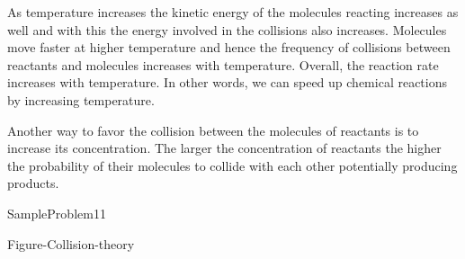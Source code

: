 \documentclass[main.tex]{subfiles}
\newcommand\chapterlabel{kinetics}
\begin{document}
\begin{description}
\begin{minipage}[b]{1.0\linewidth}
{
}\end{minipage}
\item[\docfilehook{Effect of temperature}{}] 
As temperature increases the kinetic energy of the molecules reacting increases as well and with this the energy involved in the collisions also increases. Molecules move faster at higher temperature and hence the frequency of collisions between reactants and molecules increases with temperature. Overall, the reaction rate increases with temperature. In other words, we can speed up chemical reactions by increasing temperature.
\item[\docfilehook{Concentration of reactants}{}] 
Another way to favor the collision between the molecules of reactants is to increase its concentration. The larger the concentration of reactants the higher the probability of their molecules to collide with each other potentially producing products.

  {SampleProblem11}



\hspace{2cm}\vspace{1cm}  {Figure-Collision-theory} \newpage


\end{description}
\end{document}
